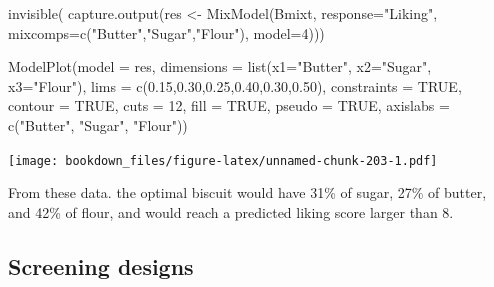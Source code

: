\documentclass[
]{krantz}
\makeatletter
\newenvironment{Shaded}{\begin{snugshade}}{\end{snugshade}}
\newcommand{\AttributeTok}[1]{\textcolor[rgb]{0.61,0.61,0.61}{#1}}
\newcommand{\ConstantTok}[1]{\textcolor[rgb]{0,0,0}{#1}}
\newcommand{\DecValTok}[1]{\textcolor[rgb]{0.06,0.06,0.06}{#1}}
\newcommand{\FloatTok}[1]{\textcolor[rgb]{0.06,0.06,0.06}{#1}}
\newcommand{\FunctionTok}[1]{\textcolor[rgb]{0,0,0}{#1}}
\newcommand{\NormalTok}[1]{#1}
\newcommand{\OtherTok}[1]{\textcolor[rgb]{0.37,0.37,0.37}{#1}}
\newcommand{\StringTok}[1]{\textcolor[rgb]{0.5,0.5,0.5}{#1}}
\newenvironment{kframe}{%
\medskip{}
\setlength{\fboxsep}{.8em}
 \def\at@end@of@kframe{}%
 \ifinner\ifhmode%
  \def\at@end@of@kframe{\end{minipage}}%
  \begin{minipage}{\columnwidth}%
 \fi\fi%
 \def\FrameCommand##1{\hskip\@totalleftmargin \hskip-\fboxsep
 \colorbox{shadecolor}{##1}\hskip-\fboxsep
     \hskip-\linewidth \hskip-\@totalleftmargin \hskip\columnwidth}%
 \MakeFramed {\advance\hsize-\width
   \@totalleftmargin\z@ \linewidth\hsize
   \@setminipage}}%
 {\par\unskip\endMakeFramed%
 \at@end@of@kframe}
\renewenvironment{Shaded}{\begin{kframe}}{\end{kframe}}
\makeatother
\begin{document}
\begin{Shaded}
\begin{Highlighting}[]
\FunctionTok{invisible}\NormalTok{(}
  \FunctionTok{capture.output}\NormalTok{(res }\OtherTok{\textless{}{-}} \FunctionTok{MixModel}\NormalTok{(Bmixt, }\AttributeTok{response=}\StringTok{"Liking"}\NormalTok{, }
                                 \AttributeTok{mixcomps=}\FunctionTok{c}\NormalTok{(}\StringTok{"Butter"}\NormalTok{,}\StringTok{"Sugar"}\NormalTok{,}\StringTok{"Flour"}\NormalTok{), }
                                 \AttributeTok{model=}\DecValTok{4}\NormalTok{)))}

\FunctionTok{ModelPlot}\NormalTok{(}\AttributeTok{model =}\NormalTok{ res,}
          \AttributeTok{dimensions =} \FunctionTok{list}\NormalTok{(}\AttributeTok{x1=}\StringTok{"Butter"}\NormalTok{, }\AttributeTok{x2=}\StringTok{"Sugar"}\NormalTok{, }\AttributeTok{x3=}\StringTok{"Flour"}\NormalTok{),}
          \AttributeTok{lims =} \FunctionTok{c}\NormalTok{(}\FloatTok{0.15}\NormalTok{,}\FloatTok{0.30}\NormalTok{,}\FloatTok{0.25}\NormalTok{,}\FloatTok{0.40}\NormalTok{,}\FloatTok{0.30}\NormalTok{,}\FloatTok{0.50}\NormalTok{), }\AttributeTok{constraints =} \ConstantTok{TRUE}\NormalTok{,}
          \AttributeTok{contour =} \ConstantTok{TRUE}\NormalTok{, }\AttributeTok{cuts =} \DecValTok{12}\NormalTok{, }\AttributeTok{fill =} \ConstantTok{TRUE}\NormalTok{, }\AttributeTok{pseudo =} \ConstantTok{TRUE}\NormalTok{,}
          \AttributeTok{axislabs =} \FunctionTok{c}\NormalTok{(}\StringTok{"Butter"}\NormalTok{, }\StringTok{"Sugar"}\NormalTok{, }\StringTok{"Flour"}\NormalTok{))}
\end{Highlighting}
\end{Shaded}

\texttt{[image: bookdown\_files/figure-latex/unnamed-chunk-203-1.pdf]}

From these data. the optimal biscuit would have 31\% of sugar, 27\% of butter, and 42\% of flour, and would reach a predicted liking score larger than 8.

\hypertarget{screening-designs}{%
\subsection{Screening designs}\label{screening-designs}}
\end{document}
